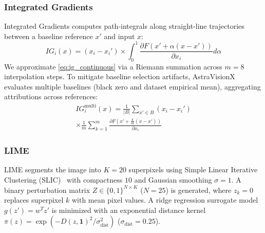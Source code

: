\documentclass[journal,10pt,twocolumn]{IEEEtran}
\begin{document}
\subsubsection{Integrated Gradients}
Integrated Gradients computes path-integrals along straight-line trajectories between a baseline reference $x'$ and input $x$:
\begin{equation}
\label{eq:ig_continuous}
IG_i(x) = (x_i - x_i') \times \int_0^1 \frac{\partial F(x' + \alpha(x - x'))}{\partial x_i} d\alpha
\end{equation}
We approximate \eqref{eq:ig_continuous} via a Riemann summation across $m = 8$ interpolation steps. To mitigate baseline selection artifacts, AstraVisionX evaluates multiple baselines (black zero and dataset empirical mean), aggregating attributions across references:
\begin{multline}
IG_i^{\text{multi}}(x) = \frac{1}{|B|} \sum_{x' \in B} (x_i - x_i') \\
\times \frac{1}{m} \sum_{k=1}^m \frac{\partial F(x' + \frac{k}{m}(x - x'))}{\partial x_i}
\end{multline}

\subsubsection{LIME}
LIME segments the image into $K = 20$ superpixels using Simple Linear Iterative Clustering (SLIC)~\cite{achanta2012slic} with compactness $10$ and Gaussian smoothing $\sigma = 1$. A binary perturbation matrix $Z \in \{0, 1\}^{N \times K}$ ($N=25$) is generated, where $z_k = 0$ replaces superpixel $k$ with mean pixel values. A ridge regression surrogate model $g(z') = w^T z'$ is minimized with an exponential distance kernel $\pi(z) = \exp(-D(z, \mathbf{1})^2 / \sigma_{\text{dist}}^2)$ ($\sigma_{\text{dist}} = 0.25$).
\end{document}
